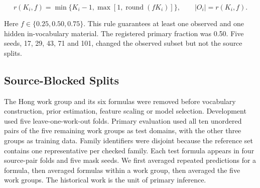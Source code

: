 \documentclass[11pt]{article}
\begin{document}
\begin{equation}
\label{eq:mask-cardinality}
r(K_i,f)=\min\{K_i-1,\max[1,\operatorname{round}(fK_i)]\},\qquad |O_i|=r(K_i,f).
\end{equation}

Here \(f\in\{0.25,0.50,0.75\}\). This rule guarantees at least one observed and one hidden in-vocabulary material. The registered primary fraction was 0.50. Five seeds, 17, 29, 43, 71 and 101, changed the observed subset but not the source splits.

\subsection{Source-Blocked Splits}

The Hong work group and its six formulas were removed before vocabulary construction, prior estimation, feature scaling or model selection. Development used five leave-one-work-out folds. Primary evaluation used all ten unordered pairs of the five remaining work groups as test domains, with the other three groups as training data. Family identifiers were disjoint because the reference set contains one representative per checked family. Each test formula appears in four source-pair folds and five mask seeds. We first averaged repeated predictions for a formula, then averaged formulas within a work group, then averaged the five work groups. The historical work is the unit of primary inference.
\end{document}
